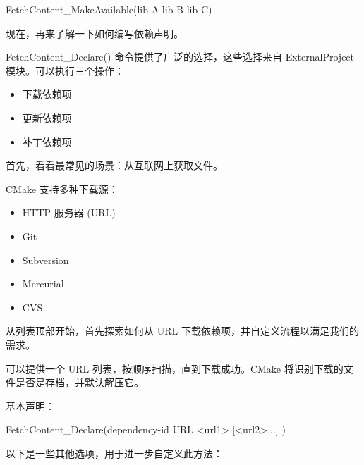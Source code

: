 \begin{cmake}
FetchContent_MakeAvailable(lib-A lib-B lib-C)
\end{cmake}

现在，再来了解一下如何编写依赖声明。


FetchContent\_Declare() 命令提供了广泛的选择，这些选择来自 ExternalProject 模块。可以执行三个操作：

\begin{itemize}
\item
下载依赖项

\item
更新依赖项

\item
补丁依赖项
\end{itemize}

首先，看看最常见的场景：从互联网上获取文件。

CMake 支持多种下载源：

\begin{itemize}
\item
HTTP 服务器 (URL)

\item
Git

\item
Subversion

\item
Mercurial

\item
CVS
\end{itemize}

从列表顶部开始，首先探索如何从 URL 下载依赖项，并自定义流程以满足我们的需求。


可以提供一个 URL 列表，按顺序扫描，直到下载成功。CMake 将识别下载的文件是否是存档，并默认解压它。

基本声明：

\begin{shell}
FetchContent_Declare(dependency-id
                     URL <url1> [<url2>...]
)
\end{shell}

以下是一些其他选项，用于进一步自定义此方法：

